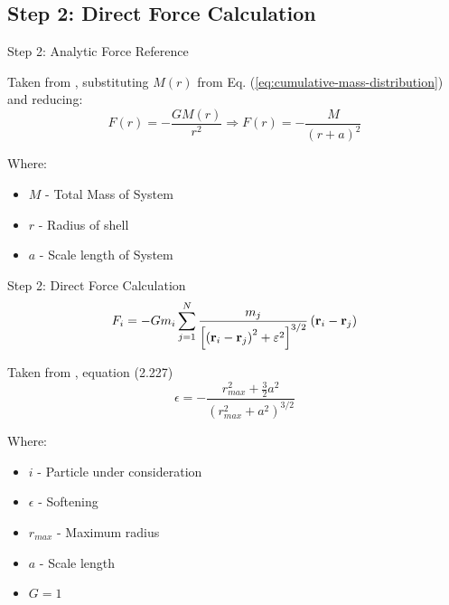 \subsection{Step 2: Direct Force Calculation}
\begin{frame}{Step 2: Analytic Force Reference}

	Taken from \cite{2008gady}, substituting $M(r)$ from Eq. (\ref{eq:cumulative-mass-distribution}) and
	reducing:
	\begin{equation}
		F(r) = - \frac{GM(r)}{r^2} \Rightarrow F(r) = - \frac{M}{(r+a)^2}
		\label{eq:newton-force}
	\end{equation}

	{\footnotesize Where:
	\begin{itemize}
		\item $M$ - Total Mass of System
		\item $r$ - Radius of shell
		\item $a$ - Scale length of System
	\end{itemize}}
\end{frame}

\begin{frame}{Step 2: Direct Force Calculation}
	\begin{equation}
		F_i=-G m_i \sum_{j=1}^N \frac{m_j}{\left[\left(\vb{r}_i-\vb{r}_j\right)^2+\varepsilon^2\right]^{3 /
				2}}\left(\vb{r}_i-\vb{r}_j\right)
		\label{eq:direct-force-full}
	\end{equation}


	Taken from \cite{2008gady}, equation (2.227)
	\begin{equation}
		\epsilon=-\frac{r_{max}^2+\frac{3}{2} a^2}{\left(r_{max}^2+a^2\right)^{3 / 2}}
		\label{eq:softening}
	\end{equation}

	{\footnotesize Where:
	\begin{itemize}
		\item $i$ - Particle under consideration
		\item $\epsilon$ - Softening
		\item $r_{max}$ - Maximum radius
		\item $a$ - Scale length
		\item $G=1$
	\end{itemize} }
\end{frame}

